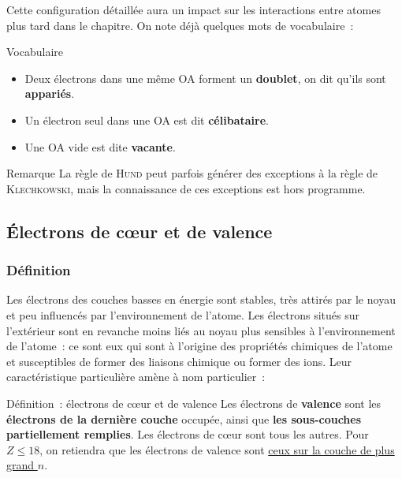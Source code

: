 \documentclass[../main/main.tex]{subfiles}
\begin{document}
Cette configuration détaillée aura un impact sur les interactions entre atomes
plus tard dans le chapitre. On note déjà quelques mots de vocabulaire~:

\begin{tdefi}{Vocabulaire}
    \begin{itemize}[label=$\diamond$, leftmargin=20pt]
        \item Deux électrons dans une même OA forment un \textbf{doublet}, on
            dit qu'ils sont \textbf{appariés}.
        \item Un électron seul dans une OA est dit \textbf{célibataire}.
        \item Une OA vide est dite \textbf{vacante}.
    \end{itemize}
\end{tdefi}

\begin{rrema}{Remarque}
    La règle de \textsc{Hund} peut parfois générer des exceptions à la règle de
    \textsc{Klechkowski}, mais la connaissance de ces exceptions est hors
    programme.
\end{rrema}

\subsection{Électrons de cœur et de valence}
\subsubsection{Définition}

Les électrons des couches basses en énergie sont stables, très attirés par le
noyau et peu influencés par l'environnement de l'atome. Les électrons situés sur
l'extérieur sont en revanche moins liés au noyau plus sensibles à
l'environnement de l'atome~: ce sont eux qui sont à l'origine des propriétés
chimiques de l'atome et susceptibles de former des liaisons chimique ou former
des ions. Leur caractéristique particulière amène à nom particulier~:

\begin{tdefi}{Définition~: électrons de cœur et de valence}
    Les électrons de \textbf{valence} sont les \textbf{électrons de la dernière
    couche} occupée, ainsi que \textbf{les sous-couches partiellement remplies}.
    Les électrons de cœur sont tous les autres. \bigbreak
    Pour $Z \leq 18$, on retiendra que les électrons de valence sont \ul{ceux
    sur la couche de plus grand $n$}.
\end{tdefi}
\end{document}
